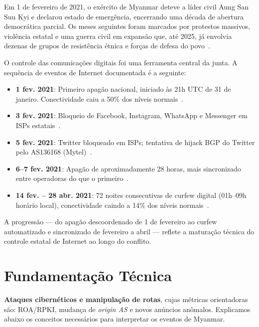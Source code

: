 \documentclass[12pt]{article}
\begin{document}
Em 1\textordmasculine{} de fevereiro de 2021, o exército de Myanmar deteve a líder civil
Aung San Suu Kyi e declarou estado de emergência, encerrando uma década de
abertura democrática parcial. Os meses seguintes foram marcados por protestos
massivos, violência estatal e uma guerra civil em expansão que, até 2025, já
envolvia dezenas de grupos de resistência étnica e forças de defesa do
povo~\cite{dcd:2026}.

O controle das comunicações digitais foi uma ferramenta central da junta.
A sequência de eventos de Internet documentada é a seguinte:

\begin{itemize}
  \item \textbf{1 fev. 2021}: Primeiro apagão nacional, iniciado às 21h UTC de
    31 de janeiro. Conectividade caiu a 50\% dos níveis normais~\cite{netblocks:2021}.
  \item \textbf{3 fev. 2021}: Bloqueio de Facebook, Instagram, WhatsApp e
    Messenger em ISPs estatais~\cite{netblocks:2021}.
  \item \textbf{5 fev. 2021}: Twitter bloqueado em ISPs; tentativa de hijack BGP
    do Twitter pelo AS136168 (Mytel)~\cite{ooni:multiperspective}.
  \item \textbf{6--7 fev. 2021}: Apagão de aproximadamente 28 horas, mais
    sincronizado entre operadoras do que o primeiro~\cite{ooni:multiperspective}.
  \item \textbf{14 fev. -- 28 abr. 2021}: 72 noites consecutivas de curfew
    digital (01h--09h horário local), conectividade caindo a 14\% dos níveis
    normais~\cite{ooni:multiperspective, netblocks:2021}.
\end{itemize}

A progressão --- do apagão descoordenado de 1\textordmasculine{} de fevereiro ao curfew
automatizado e sincronizado de fevereiro a abril --- reflete a maturação
técnica do controle estatal de Internet ao longo do conflito.


\section{Fundamentação Técnica}

\textbf{Ataques cibernéticos e manipulação de rotas},
cujas métricas orientadoras são: ROA/RPKI, mudança de \textit{origin AS} e
novos anúncios anômalos. Explicamos abaixo os conceitos necessários para
interpretar os eventos de Myanmar.
\end{document}
